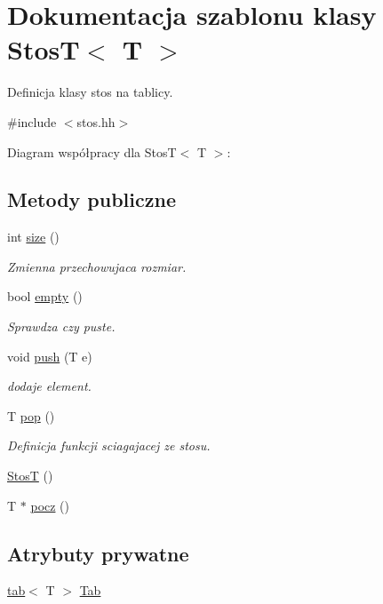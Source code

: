 \hypertarget{class_stos_t}{\section{\-Dokumentacja szablonu klasy \-Stos\-T$<$ \-T $>$}
\label{class_stos_t}
}


\-Definicja klasy stos na tablicy.  




{\ttfamily \#include $<$stos.\-hh$>$}



\-Diagram współpracy dla \-Stos\-T$<$ \-T $>$\-:
\subsection*{\-Metody publiczne}
\begin{DoxyCompactItemize}
\item 
int \hyperlink{class_stos_t_a5e3e0a5bb07ae2cecbff86705c6e7710}{size} ()
\begin{DoxyCompactList}\small\item\em \-Zmienna przechowujaca rozmiar. \end{DoxyCompactList}\item 
bool \hyperlink{class_stos_t_afb1cd36b9ec9dd8c9aa5b832b09bff9e}{empty} ()
\begin{DoxyCompactList}\small\item\em \-Sprawdza czy puste. \end{DoxyCompactList}\item 
void \hyperlink{class_stos_t_a55f36558cb39bded28a1ed3c37cbcee6}{push} (\-T e)
\begin{DoxyCompactList}\small\item\em dodaje element. \end{DoxyCompactList}\item 
\-T \hyperlink{class_stos_t_a3024f48043bfdbca81df37c11af4db87}{pop} ()
\begin{DoxyCompactList}\small\item\em \-Definicja funkcji sciagajacej ze stosu. \end{DoxyCompactList}\item 
\hyperlink{class_stos_t_ab41a68addc4429c2cb94488938cb5673}{\-Stos\-T} ()
\item 
\-T $\ast$ \hyperlink{class_stos_t_a02a6620a75da4bc9d324475c2b8e1d3a}{pocz} ()
\end{DoxyCompactItemize}
\subsection*{\-Atrybuty prywatne}
\begin{DoxyCompactItemize}
\item 
\hyperlink{classtab}{tab}$<$ \-T $>$ \hyperlink{class_stos_t_a81a86528f33fe2688b586fdf7eb0db4b}{\-Tab}
\end{DoxyCompactItemize}


